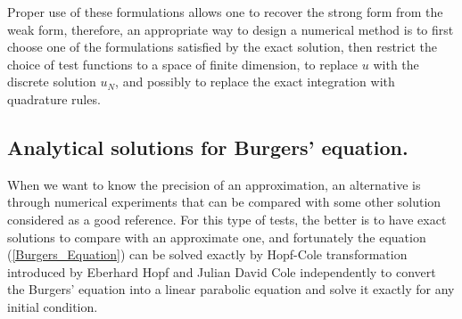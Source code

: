 	Proper use of these formulations allows one to recover the strong form from the weak form, therefore, an appropriate way to design a numerical method is to first choose one of the formulations satisfied by the exact solution, then restrict the choice of test functions to a space of finite dimension, to replace $u$ with the discrete solution $u_N$, and possibly to replace the exact integration with quadrature rules. \\
	
   
    \subsection{Analytical solutions for Burgers' equation.}
    
    When we want to know the precision of an approximation, an alternative is through numerical experiments that can be compared with some other solution considered as a good reference. For this type of tests, the better is to have exact solutions to compare with an approximate one, and fortunately the equation (\ref{Burgers_Equation}) can be solved exactly by Hopf-Cole transformation introduced by Eberhard Hopf \cite{Hopf1950} and Julian David Cole \cite{Cole1951} independently to convert the Burgers' equation into a linear parabolic equation and solve it exactly for any initial condition. \\
  
